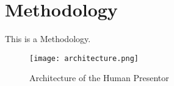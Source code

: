 
\section{Methodology}
This is a Methodology.

\begin{figure}[H]
  \centering
  \texttt{[image: architecture.png]}
  \caption{Architecture of the Human Presentor}
  \label{fig:architecture}
\end{figure}
